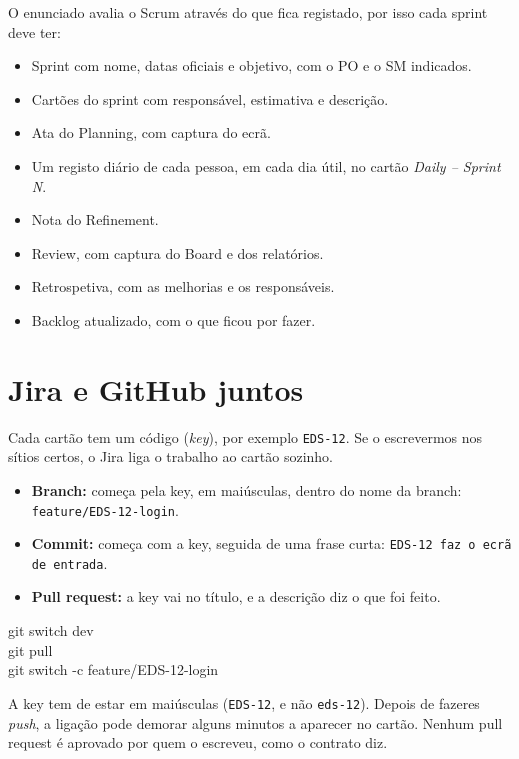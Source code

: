 \documentclass[11pt,a4paper]{article}
\begin{document}
O enunciado avalia o Scrum através do que fica registado, por isso cada sprint deve ter:

\begin{itemize}[label=\textcolor{azul}{$\square$}]
  \item Sprint com nome, datas oficiais e objetivo, com o PO e o SM indicados.
  \item Cartões do sprint com responsável, estimativa e descrição.
  \item Ata do Planning, com captura do ecrã.
  \item Um registo diário de cada pessoa, em cada dia útil, no cartão \textit{Daily – Sprint N}.
  \item Nota do Refinement.
  \item Review, com captura do Board e dos relatórios.
  \item Retrospetiva, com as melhorias e os responsáveis.
  \item Backlog atualizado, com o que ficou por fazer.
\end{itemize}

\section{Jira e GitHub juntos}

Cada cartão tem um código (\textit{key}), por exemplo \texttt{EDS-12}. Se o escrevermos nos sítios certos, o Jira liga o trabalho ao cartão sozinho.

\begin{itemize}
  \item \textbf{Branch:} começa pela key, em maiúsculas, dentro do nome da branch: \texttt{feature/EDS-12-login}.
  \item \textbf{Commit:} começa com a key, seguida de uma frase curta: \texttt{EDS-12 faz o ecrã de entrada}.
  \item \textbf{Pull request:} a key vai no título, e a descrição diz o que foi feito.
\end{itemize}

\begin{codigo}
git switch dev\\
git pull\\
git switch -c feature/EDS-12-login
\end{codigo}

A key tem de estar em maiúsculas (\texttt{EDS-12}, e não \texttt{eds-12}). Depois de fazeres \textit{push}, a ligação pode demorar alguns minutos a aparecer no cartão. Nenhum pull request é aprovado por quem o escreveu, como o contrato diz.
\end{document}
